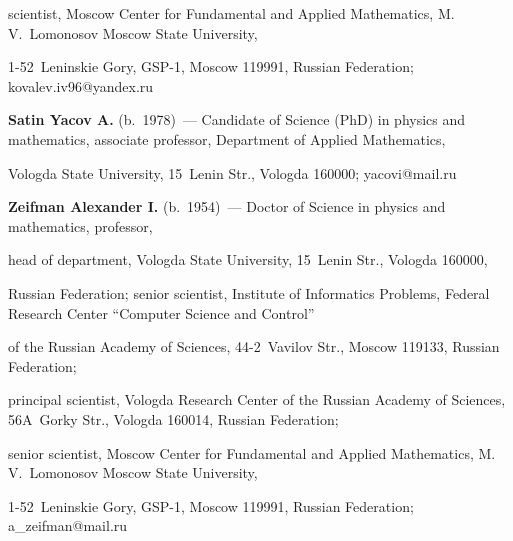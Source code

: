 scientist, Moscow Center for Fundamental and Applied Mathematics, M.\,V.~Lomonosov Moscow State University, 

1-52~Leninskie Gory, GSP-1, Moscow 119991, Russian Federation; \mbox{kovalev.iv96@yandex.ru}



\vspace*{4pt}



\noindent

\textbf{Satin Yacov A.} (b.\ 1978)~--- Candidate of Science (PhD) in physics and mathematics, associate professor, Department of Applied Mathematics,

 Vologda State University, 15~Lenin Str., Vologda 160000; \mbox{yacovi@mail.ru}



\vspace*{4pt}



\noindent

\textbf{Zeifman Alexander I.} (b.\ 1954)~--- Doctor of Science in physics and mathematics, professor,

 head of department, Vologda State University, 15~Lenin Str., Vologda 160000, 

Russian Federation; senior scientist, Institute of Informatics Problems, Federal Research Center ``Computer Science and Control'' 

of the Russian Academy of Sciences, 44-2~Vavilov Str., Moscow 119133, Russian Federation; 

principal scientist, Vologda Research Center of the Russian Academy of Sciences, 56A~Gorky Str., Vologda 160014, Russian Federation;

 senior scientist, Moscow Center for Fundamental and Applied Mathematics, M.\,V.~Lomonosov Moscow State University, 

 1-52~Leninskie Gory, GSP-1, Moscow 119991, Russian Federation; \mbox{a\_zeifman@mail.ru}

 

\label{end\stat}



\renewcommand{\bibname}{\protect\rm Литература} 

